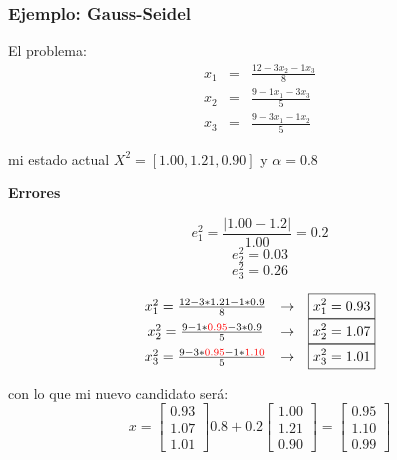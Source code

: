 \documentclass[xcolor=svgnames]{beamer} %
\theoremstyle{plain}
\renewcommand{\textbf}[1]{{\bfseries\textcolor{redUnq2}{#1}}}
\theoremstyle{definition}
\begin{document}
\begin{frame}
\frametitle{Ejemplo: Gauss-Seidel}

\begin{minipage}{.4\linewidth}
El problema:\vspace{-5pt}
$$\begin{array}{ccc}
x_1 &=& \frac{12-3x_2-1x_3}{8}\\
x_2 &=& \frac{9-1x_1-3x_3}{5}\\
x_3 &=& \frac{9-3x_1-1x_2}{5}
\end{array}$$

mi estado actual $X^2 =[1.00,1.21,0.90]$ y $\alpha=0.8$ \vspace{-5pt}
\end{minipage} \vrule \begin{minipage}{.5\linewidth}
\begin{center}
  \textbf{Errores}
\end{center}
$$e_1^2 = \frac{|1.00 -1.2|}{1.00} = 0.2$$
$$e_2^2 = 0.03$$
$$e_3^2 = 0.26$$
\end{minipage}


\begin{minipage}{.55\linewidth}
\pause
\small
$$\begin{array}{cll}
x_1^2 = \frac{12-3*1.21-1*0.9}{8} &\rightarrow & \boxed{x_1^2 = 0.93}\\
x_2^2 = \frac{9-1*{\color{red}0.95}-3*0.9}{5} &\rightarrow & \boxed{x_2^2 = 1.07}\\
x_3^2 = \frac{9-3*{\color{red}0.95}-1*{\color{red}1.10}}{5} &\rightarrow & \boxed{x_3^2 = 1.01}
\end{array}$$

\end{minipage} \vrule \begin{minipage}{.35\linewidth}
\small
con lo que mi nuevo candidato será:
$$x = \begin{bmatrix}
0.93\\
1.07\\
1.01
\end{bmatrix} 0.8 +0.2\begin{bmatrix}
1.00\\
1.21\\
0.90
\end{bmatrix} = \begin{bmatrix}
0.95\\
1.10\\
0.99
\end{bmatrix}$$

\end{minipage}
\end{frame}
\end{document}
